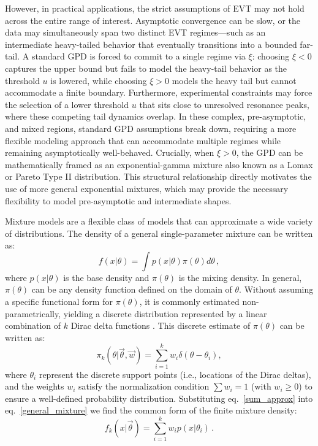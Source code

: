 \documentclass[a4paper,11pt]{article}
\begin{document}
However, in practical applications, the strict assumptions of EVT may not hold across the entire 
range of interest. Asymptotic convergence can be slow, or the data may simultaneously span two 
distinct EVT regimes---such as an intermediate heavy-tailed behavior that eventually transitions 
into a bounded far-tail. A standard GPD is forced to commit to a single regime via $\xi$: 
choosing $\xi<0$ captures the upper bound but fails to model the heavy-tail behavior as the 
threshold $u$ is lowered, while choosing $\xi>0$ models the heavy tail but cannot accommodate a 
finite boundary. Furthermore, experimental constraints may force the selection of a lower 
threshold $u$ that sits close to unresolved resonance peaks, where these competing tail dynamics 
overlap. In these complex, pre-asymptotic, and mixed regions, standard GPD assumptions break 
down, requiring a more flexible modeling approach that can accommodate multiple regimes while 
remaining asymptotically well-behaved. Crucially, when $\xi>0$, the GPD can be mathematically 
framed as an exponential-gamma mixture also known as a Lomax or Pareto Type II distribution. This structural relationship directly motivates the use of more general exponential mixtures, which may provide the necessary flexibility to model 
pre-asymptotic and intermediate shapes.

Mixture models are a flexible class of models that can approximate a wide variety of 
distributions.
The density of a general single-parameter mixture can be written as:
\begin{equation}
\label{general_mixture}
f(x|\theta) = \int p(x | \theta) \pi(\theta) d\theta \, ,
\end{equation}
where $p(x|\theta)$ is the base density and $\pi(\theta)$ is the mixing density. In general, 
$\pi(\theta)$ can be any density function defined on the domain of $\theta$. Without assuming a specific functional form for $\pi(\theta)$, it is commonly estimated non-parametrically, yielding a discrete distribution represented by a linear combination of $k$ Dirac delta functions  \cite{Kiefer_Wolfowitz, Lindsay}.
This discrete estimate of $\pi(\theta)$ can be written as:
\begin{equation}
\label{sum_approx}
\pi_k(\theta|\vec\theta, \vec{w})=\sum_{i=1}^k w_i \delta(\theta-\theta_i),
\end{equation}
where $\theta_i$ represent the discrete support points (i.e., locations of the Dirac deltas), 
and the weights $w_i$ satisfy the normalization condition $\sum w_i=1$ (with $w_i\geq0$) to 
ensure a well-defined probability distribution. Substituting eq.~\eqref{sum_approx} into 
eq.~\eqref{general_mixture}
we find the common form of the finite mixture density:
\begin{equation}
\label{finite_mixture}
f_k(x|\vec\theta) = \sum_{i=1}^k w_i p(x | \theta_i) \, .
\end{equation}
\end{document}
